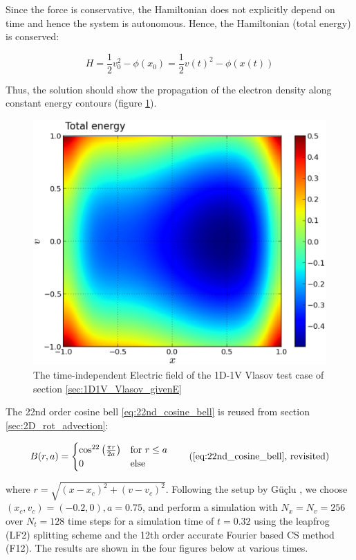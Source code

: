 \documentclass[11pt,titlepage]{report}
\begin{document}
\noindent  Since the force is conservative, the Hamiltonian does not explicitly depend on time and hence the system is autonomous. Hence, the Hamiltonian (total energy) is conserved:

$$H = \frac{1}{2}v_0^2 - \phi (x_0) = \frac{1}{2}v(t)^2 - \phi (x(t))$$

Thus, the solution should show the propagation of the electron density along constant energy contours (figure \ref{fig:W_tot}).

\begin{figure}[h!]
  \centering
    \includegraphics[scale = 0.45]{graphics/W_tot}
  \caption{The time-independent Electric field of the 1D-1V Vlasov test case of section \ref{sec:1D1V_Vlasov_givenE}}
  \label{fig:W_tot}
\end{figure}

The 22nd order cosine bell \ref{eq:22nd_cosine_bell} is reused from section \ref{sec:2D_rot_advection}:

\begin{equation*}
 B(r,a) =
  \begin{cases}
  \cos^{22}\left(\tfrac{\pi r}{2a}\right) & \text{for } r \leq a \\
   0       & \text{else }
  \end{cases} \tag{\ref{eq:22nd_cosine_bell}, revisited}
\end{equation*}

\noindent where $r = \sqrt{(x - x_c)^2 + (v - v_c)^2}$. Following the setup by G\"u\c{c}lu , we choose $(x_c, v_c) = (-0.2, 0), a = 0.75$, and perform a simulation with $N_x = N_v = 256$ over $N_t = 128$ time steps for a simulation time of $t = 0.32$ using the leapfrog (LF2) splitting scheme and the 12th order accurate Fourier based CS method (F12). The results are shown in the four figures below at various times. 
\end{document}
